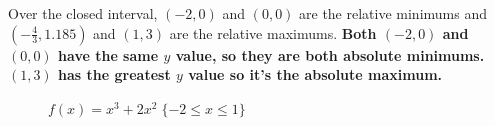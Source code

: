 \documentclass[12pt]{article}
\begin{document}
                Over the closed interval, $(-2, 0)$ and $(0, 0)$ are the relative minimums and $(-\frac{4}{3}, 1.185)$ and $(1, 3)$ are the relative maximums.
                \newline \newline
                \textbf{Both $(-2, 0)$ and $(0, 0)$ have the same $y$ value, so they are both absolute minimums. $(1, 3)$ has the greatest $y$ value so it's the absolute maximum.}
                \begin{figure}[h]
                    \begin{center}
                        \caption{$f(x) = x^3 + 2x^2 \; \{-2 \le x \le 1 \}$}
                        \label{fig:absextremaclosed}
                    \end{center}
                \end{figure}
\end{document}
